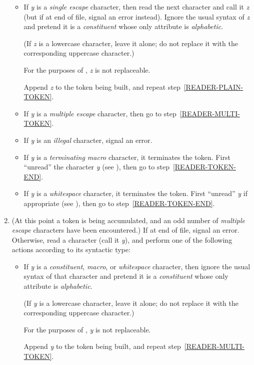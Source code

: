 \begin{enumerate}
\begin{itemize}
\item
If \emph{y} is a \emph{single escape} character, then read the next character
and call it \emph{z}
(but if at end of file, signal an error instead).
Ignore the usual syntax of \emph{z}
and pretend it is a \emph{constituent} whose only attribute is
\emph{alphabetic}.
\begin{obsolete}
(If \emph{z} is a lowercase character, leave it alone;
do not replace it with the corresponding uppercase character.)
\end{obsolete}
\begin{newer}
For the purposes of , \emph{z} is not replaceable.
\end{newer}
Append \emph{z} to the token being built,
and repeat step~\ref{READER-PLAIN-TOKEN}.

\item
If \emph{y} is a \emph{multiple escape} character,
then go to step~\ref{READER-MULTI-TOKEN}.

\item
If \emph{y} is an \emph{illegal} character, signal an error.

\item
If \emph{y} is a \emph{terminating macro} character, it terminates
the token.  First ``unread'' the character \emph{y}
(see ), then go to step~\ref{READER-TOKEN-END}.

\item
If \emph{y} is a \emph{whitespace} character, it terminates
the token.  First ``unread'' \emph{y}
if appropriate (see ),
then go to step~\ref{READER-TOKEN-END}.
\end{itemize}

\item
(At this point a token is being accumulated, and an odd number
of \emph{multiple escape} characters have been encountered.)
If at end of file, signal an error.
Otherwise, read a character (call it \emph{y}), and
perform one of the following actions according to its syntactic type:
\label{READER-MULTI-TOKEN}
\begin{itemize}
\item
If \emph{y} is a \emph{constituent}, \emph{macro}, or \emph{whitespace}
character, then ignore the usual syntax of that character
and pretend it is a \emph{constituent} whose only attribute is
\emph{alphabetic}.
\begin{obsolete}
(If \emph{y} is a lowercase character, leave it alone;
do not replace it with the corresponding uppercase character.)
\end{obsolete}
\begin{newer}
For the purposes of , \emph{y} is not replaceable.
\end{newer}
Append \emph{y} to the token being built,
and repeat step~\ref{READER-MULTI-TOKEN}.


\end{itemize}
\end{enumerate}
